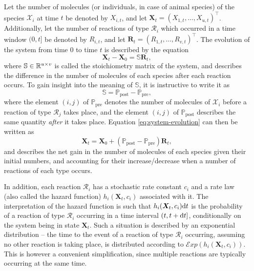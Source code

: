 Let the number of molecules (or individuals, in case of animal species) of the species $\mathcal{X}_i$ at time $t$ be denoted by $X_{i,t}$, and let $\bm{X}_t = \left(X_{1,t}, \ldots, X_{u,t}\right)^\intercal$. Additionally, let the number of reactions of type $\mathcal{R}_i$ which occurred in a time window $(0, t]$ be denoted by $R_{i,t}$, and let $\bm{R}_t = \left(R_{1,t}, \ldots,R_{v,t}\right)^\intercal$. The evolution of the system from time 0 to time $t$ is described by the equation
\begin{equation} \label{eq:system-evolution}
\bm{X}_t - \bm{X}_0 = \mathbb{S}\bm{R}_t,
\end{equation}
where $\mathbb{S} \in \mathbb{R}^{u \times v}$ is called the stoichiometry matrix of the system, and describes the difference in the number of molecules of each species after each reaction occurs. To gain insight into the meaning of $\mathbb{S}$, it is instructive to write it as
\begin{equation*}
\mathbb{S} = \mathbb{P}_\text{post} - \mathbb{P}_\text{pre},
\end{equation*}
where the element $(i,j)$ of $\mathbb{P}_\text{pre}$ denotes the number of molecules of $\mathcal{X}_i$ before a reaction of type $\mathcal{R}_j$ takes place, and the element $(i,j)$ of $\mathbb{P}_\text{post}$ describes the same quantity \emph{after} it takes place. Equation \eqref{eq:system-evolution} can then be written as
\begin{equation*}
\bm{X}_t = \bm{X}_0 + \left(\mathbb{P}_\text{post} - \mathbb{P}_\text{pre}\right) \bm{R}_t,
\end{equation*}
and describes the net gain in the number of molecules of each species given their initial numbers, and accounting for their increase/decrease when a number of reactions of each type occurs.

In addition, each reaction $\mathcal{R}_i$ has a stochastic rate constant $c_i$ and a rate law (also called the hazard function) $h_i(\bm{X}_t, c_i)$ associated with it. The interpretation of the hazard function is such that $h_i(\bm{X}_t, c_i) \mathrm{d}{t}$ is the probability of a reaction of type $\mathcal{R}_i$ occurring in a time interval $(t, t + \mathrm{d}{t}]$, conditionally on the system being in state $\bm{X}_t$. Such a situation is described by an exponential distribution -- the time to the event of a reaction of type $\mathcal{R}_i$ occurring, assuming no other reaction is taking place, is distributed according to ${\mathcal{E}\mathit{xp}\left(h_i(\bm{X}_t, c_i)\right)}$. This is however a convenient simplification, since multiple reactions are typically occurring at the same time.

